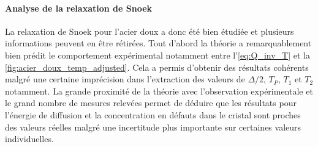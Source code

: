 \paragraph{Analyse de la relaxation de Snoek} La relaxation de Snoek pour l'acier doux a donc été bien étudiée et plusieurs informations peuvent en être rétirées. Tout d'abord la théorie a remarquablement bien prédit le comportement expérimental notamment entre l'\autoref{eq:Q_inv_T} et la \autoref{fig:acier_doux_temp_adjusted}. Cela a permis d'obtenir des résultats cohérents malgré une certaine imprécision dans l'extraction des valeurs de $\Delta / 2$, $T_P$, $T_1$ et $T_2$ notamment. La grande proximité de la théorie avec l'observation expérimentale et le grand nombre de mesures relevées permet de déduire que les résultats pour l'énergie de diffusion et la concentration en défauts dans le cristal sont proches des valeurs réelles malgré une incertitude plus importante sur certaines valeurs individuelles.